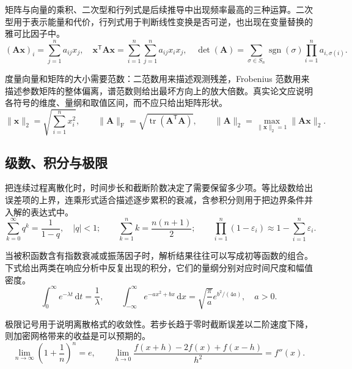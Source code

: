 矩阵与向量的乘积、二次型和行列式是后续推导中出现频率最高的三种运算。二次型用于表示能量和代价，行列式用于判断线性变换是否可逆，也出现在变量替换的雅可比因子中。
\begin{equation}
  (\bm{A}\bm{x})_i=\sum_{j=1}^{n}a_{ij}x_j,\quad
  \bm{x}^{\mathsf T}\bm{A}\bm{x}
    =\sum_{i=1}^{n}\sum_{j=1}^{n}a_{ij}x_ix_j,\quad
  \det(\bm{A})=\sum_{\sigma\in S_n}\operatorname{sgn}(\sigma)
    \prod_{i=1}^{n}a_{i,\sigma(i)}.
  \label{eq:matrix-ops}
\end{equation}

度量向量和矩阵的大小需要范数：二范数用来描述观测残差，Frobenius 范数用来描述参数矩阵的整体偏离，谱范数则给出最坏方向上的放大倍数。真实论文应说明各符号的维度、量纲和取值区间，而不应只给出矩阵形状。
\begin{equation}
  \|\bm{x}\|_2=\sqrt{\sum_{i=1}^{n}x_i^2},\qquad
  \|\bm{A}\|_{\mathrm F}=\sqrt{\operatorname{tr}(\bm{A}^{\mathsf T}\bm{A})},\qquad
  \|\bm{A}\|_2=\max_{\|\bm{x}\|_2=1}\|\bm{A}\bm{x}\|_2.
  \label{eq:norms}
\end{equation}

\subsection{级数、积分与极限}

把连续过程离散化时，时间步长和截断阶数决定了需要保留多少项。等比级数给出误差项的上界，连乘形式适合描述逐步累积的衰减，含参积分则用于把边界条件并入解的表达式中。
\begin{equation}
  \sum_{k=0}^{\infty}q^k=\frac{1}{1-q},\quad |q|<1;\qquad
  \sum_{k=1}^{n}k=\frac{n(n+1)}{2};\qquad
  \prod_{i=1}^{n}(1-\varepsilon_i)\approx1-\sum_{i=1}^{n}\varepsilon_i.
  \label{eq:series}
\end{equation}

当被积函数含有指数衰减或振荡因子时，解析结果往往可以写成初等函数的组合。下式给出两类在响应分析中反复出现的积分，它们的量纲分别对应时间尺度和幅值密度。
\begin{equation}
  \int_{0}^{\infty}e^{-\lambda t}\,\mathrm{d}t=\frac{1}{\lambda},\qquad
  \int_{-\infty}^{\infty}e^{-ax^2+bx}\,\mathrm{d}x
    =\sqrt{\frac{\pi}{a}}e^{b^2/(4a)},\quad a>0.
  \label{eq:integrals}
\end{equation}

极限记号用于说明离散格式的收敛性。若步长趋于零时截断误差以二阶速度下降，则加密网格带来的收益是可以预期的。
\begin{equation}
  \lim_{n\to\infty}\left(1+\frac{1}{n}\right)^n=e,\qquad
  \lim_{h\to0}\frac{f(x+h)-2f(x)+f(x-h)}{h^2}=f''(x).
  \label{eq:limits}
\end{equation}

